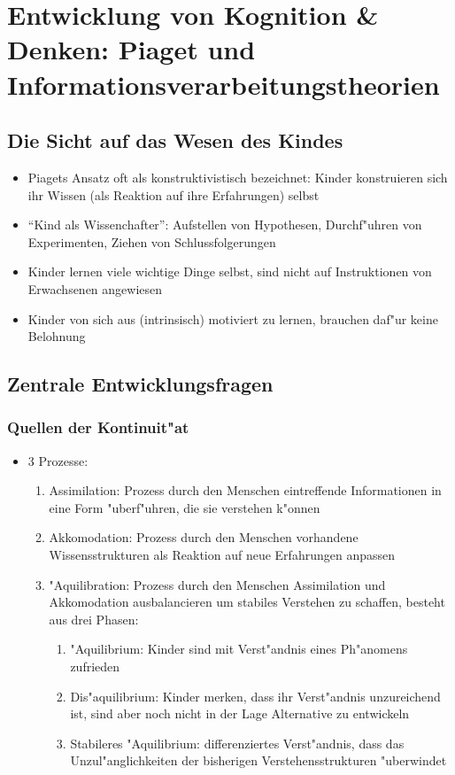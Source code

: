 \section{Entwicklung von Kognition \& Denken: Piaget und Informationsverarbeitungstheorien}
\subsection{Die Sicht auf das Wesen des Kindes}
\begin{itemize}
	\item
		Piagets Ansatz oft als konstruktivistisch bezeichnet: Kinder konstruieren sich ihr Wissen (als Reaktion auf ihre Erfahrungen) selbst
	\item
		\enquote{Kind als Wissenchafter}: Aufstellen von Hypothesen, Durchf"uhren von Experimenten, Ziehen von Schlussfolgerungen
	\item
		Kinder lernen viele wichtige Dinge selbst, sind nicht auf Instruktionen von Erwachsenen angewiesen
	\item
		Kinder von sich aus (intrinsisch) motiviert zu lernen, brauchen daf"ur keine Belohnung
\end{itemize}

\subsection{Zentrale Entwicklungsfragen}
\subsubsection{Quellen der Kontinuit"at}
\begin{itemize}
	\item
		3 Prozesse:
		\begin{enumerate}
			\item
				Assimilation: Prozess durch den Menschen eintreffende Informationen in eine Form "uberf"uhren, die sie verstehen k"onnen
			\item
				Akkomodation: Prozess durch den Menschen vorhandene Wissensstrukturen als Reaktion auf neue Erfahrungen anpassen
			\item
				"Aquilibration: Prozess durch den Menschen Assimilation und Akkomodation ausbalancieren um stabiles Verstehen zu schaffen, besteht aus drei Phasen:
				\begin{enumerate}
					\item
						"Aquilibrium: Kinder sind mit Verst"andnis eines Ph"anomens zufrieden
					\item
						Dis"aquilibrium: Kinder merken, dass ihr Verst"andnis unzureichend ist, sind aber noch nicht in der Lage Alternative zu entwickeln
					\item
						Stabileres "Aquilibrium: differenziertes Verst"andnis, dass das Unzul"anglichkeiten der bisherigen Verstehensstrukturen "uberwindet
				\end{enumerate}
		\end{enumerate}
\end{itemize}


